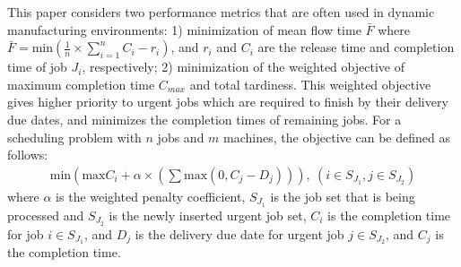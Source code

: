This paper considers two performance metrics that are often used in dynamic manufacturing environments: 1) minimization of mean flow time $\bar{F}$ where $\bar{F} = \text{min}(\frac{1}{n} \times \sum_{i = 1}^n C_i - r_i)$, and $r_i$ and $C_i$ are the release time and completion time of job $J_i$, respectively;
2) minimization of the weighted objective of maximum completion time $C_{max}$ and total tardiness. This weighted objective gives higher priority to urgent jobs which are required to finish by their delivery due dates, and minimizes the completion times of remaining jobs.
For a scheduling problem with $n$ jobs and $m$ machines, the objective can be defined as follows:
\begin{align}
	\text{min}(\text{max}C_i + \alpha \times (\sum\text{max}(0, C_j - D_j))), \ (i \in S_{J_1}, j \in S_{J_2})
\end{align}
where $\alpha$ is the weighted penalty coefficient, $S_{J_1}$ is the job set that is being processed and $S_{J_2}$ is the newly inserted urgent job set, $C_i$ is the completion time for job $i \in S_{J_1}$, and $D_j$ is the delivery due date for urgent job $j \in S_{J_2}$, and $C_j$ is the completion time.